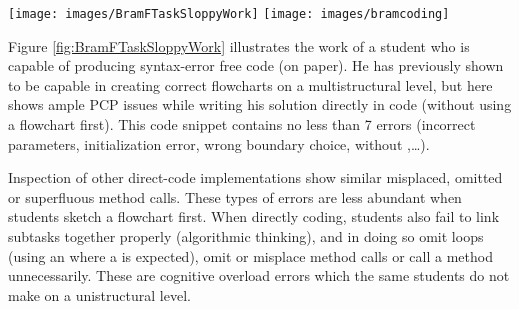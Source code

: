 %


\begin{figure*}
\centering
  \texttt{[image: images/BramFTaskSloppyWork]}\quad
  \texttt{[image: images/bramcoding]}
\caption{Flowchart skeptic (left: code with evidence of cognitive load errors; right: coding in Atlas)}
\label{fig:BramFTaskSloppyWork}
\end{figure*}



Figure \ref{fig:BramFTaskSloppyWork} illustrates the work of a student who is
capable of producing syntax-error free code (on paper). He has previously
shown to be capable in creating correct flowcharts on a multistructural
level, but here shows ample PCP issues while writing his solution directly in
code (without using a flowchart first). This code snippet contains no less
than 7 errors (incorrect parameters, initialization error, wrong boundary
choice,  without ,\ldots).

Inspection of other direct-code implementations show similar misplaced,
omitted or superfluous method calls. These types of errors are less abundant
when students sketch a flowchart first. When directly coding, students also
fail to link subtasks together properly (algorithmic thinking), and in doing
so omit loops (using an  where a  is
expected), omit or misplace method calls or call a method unnecessarily.
These are cognitive overload errors which the same students do not make on a
unistructural level.

